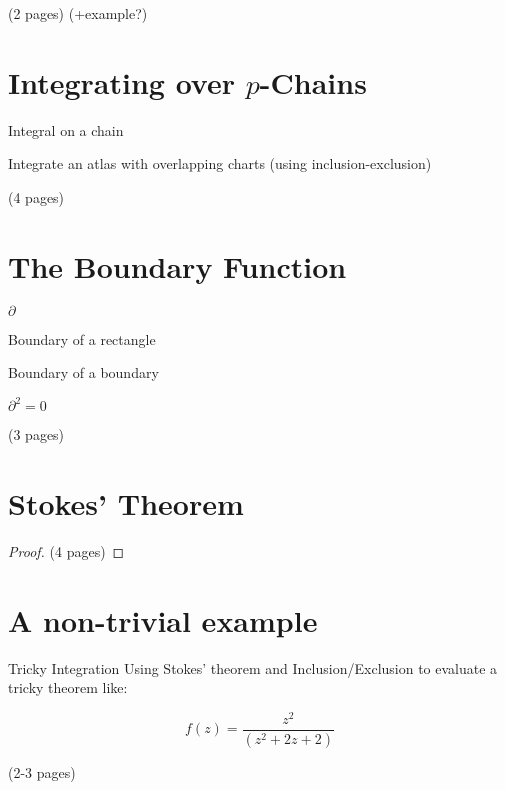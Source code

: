 (2 pages) (+example?)

\newpage \addtocounter{page}{1}

\section{Integrating over $p$-Chains}
\begin{definition}
Integral on a chain
\end{definition}

\begin{example}
Integrate an atlas with overlapping charts (using inclusion-exclusion)
\end{example}

(4 pages)

\newpage \addtocounter{page}{3}

\section{The Boundary Function}

\begin{definition}
$\partial$
\end{definition}

\begin{example}
Boundary of a rectangle
\end{example}

\begin{example}
Boundary of a boundary
\end{example}

\begin{theorem}
$\partial^2 = 0$
\end{theorem}

(3 pages)

\newpage \addtocounter{page}{2}

\section{Stokes' Theorem}
\begin{proof}
(4 pages)
\end{proof}


\newpage \addtocounter{page}{3}

\section{A non-trivial example}
\begin{example}{Tricky Integration}
Using Stokes' theorem and Inclusion/Exclusion to evaluate a tricky theorem like:

\begin{equation}
f(z) = \frac{z^2}{(z^2 + 2z + 2)}
\end{equation}


 (2-3 pages)


\end{example}

\newpage \addtocounter{page}{2}

